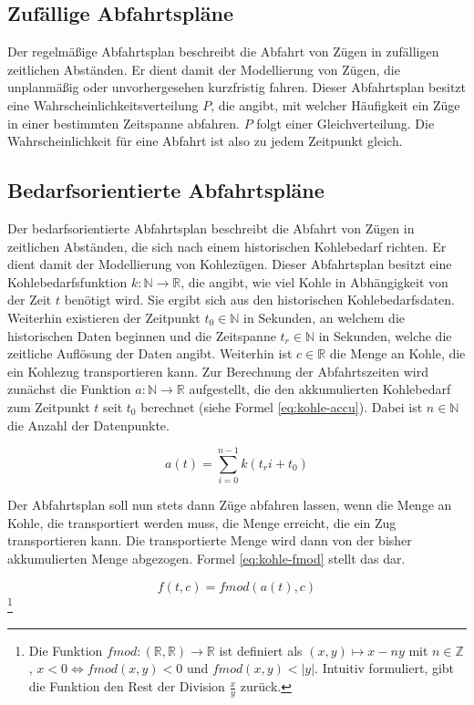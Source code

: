 \subsection{Zufällige Abfahrtspläne}

Der regelmäßige Abfahrtsplan beschreibt die Abfahrt von Zügen in zufälligen zeitlichen Abständen. Er dient damit der Modellierung von Zügen, die unplanmäßig oder unvorhergesehen kurzfristig fahren. Dieser Abfahrtsplan besitzt eine Wahrscheinlichkeitsverteilung $P$, die angibt, mit welcher Häufigkeit ein Züge in einer bestimmten Zeitspanne abfahren. $P$ folgt einer Gleichverteilung. Die Wahrscheinlichkeit für eine Abfahrt ist also zu jedem Zeitpunkt gleich.

\subsection{Bedarfsorientierte Abfahrtspläne}

Der bedarfsorientierte Abfahrtsplan beschreibt die Abfahrt von Zügen in zeitlichen Abständen, die sich nach einem historischen Kohlebedarf richten. Er dient damit der Modellierung von Kohlezügen. Dieser Abfahrtsplan besitzt eine Kohlebedarfsfunktion $k:\mathbb{N}\to\mathbb{R}$, die angibt, wie viel Kohle in Abhängigkeit von der Zeit $t$ benötigt wird. Sie ergibt sich aus den historischen Kohlebedarfsdaten. Weiterhin existieren der Zeitpunkt $t_0 \in \mathbb{N}$ in Sekunden, an welchem die historischen Daten beginnen und die Zeitspanne $t_r \in \mathbb{N}$ in Sekunden, welche die zeitliche Auflösung der Daten angibt. Weiterhin ist $c\in\mathbb{R}$ die Menge an Kohle, die ein Kohlezug transportieren kann. Zur Berechnung der Abfahrtszeiten wird zunächst die Funktion $a: \mathbb{N} \to \mathbb{R}$ aufgestellt, die den akkumulierten Kohlebedarf zum Zeitpunkt $t$ seit $t_0$ berechnet (siehe Formel \ref{eq:kohle-accu}). Dabei ist $n\in\mathbb{N}$ die Anzahl der Datenpunkte.

\begin{equation}
    a(t)=\sum_{i=0}^{n-1}  k(t_ri+t_0)\label{eq:kohle-accu}
\end{equation}

Der Abfahrtsplan soll nun stets dann Züge abfahren lassen, wenn die Menge an Kohle, die transportiert werden muss, die Menge erreicht, die ein Zug transportieren kann. Die transportierte Menge wird dann von der bisher akkumulierten Menge abgezogen. Formel \ref{eq:kohle-fmod} stellt das dar.

\begin{equation}
    f(t, c)=fmod(a(t), c)\label{eq:kohle-fmod}
\end{equation}\footnote{Die Funktion $fmod:(\mathbb{R},\mathbb{R}) \to \mathbb{R}$ ist definiert als $(x,y)\mapsto x-ny$ mit $n\in\mathbb{Z}$, $x<0\Leftrightarrow fmod(x,y)<0$ und $fmod(x,y)<|y|$. Intuitiv formuliert, gibt die Funktion den Rest der Division $\frac{x}{y}$ zurück.}


